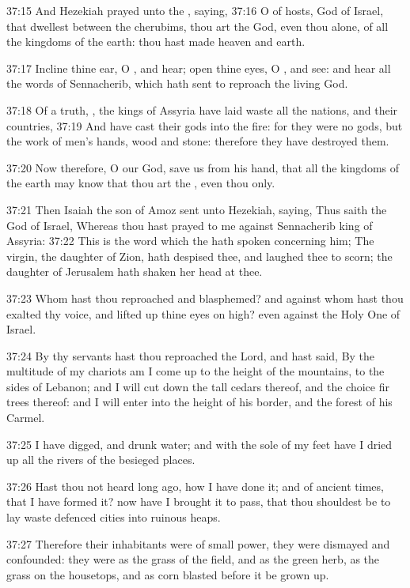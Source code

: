 37:15 And Hezekiah prayed unto the \LORD, saying, 37:16 O \LORD of hosts, God of Israel, that dwellest between the cherubims, thou art the God, even thou alone, of all the kingdoms of the earth: thou hast made heaven and earth.

37:17 Incline thine ear, O \LORD, and hear; open thine eyes, O \LORD, and see: and hear all the words of Sennacherib, which hath sent to reproach the living God.

37:18 Of a truth, \LORD, the kings of Assyria have laid waste all the nations, and their countries, 37:19 And have cast their gods into the fire: for they were no gods, but the work of men's hands, wood and stone: therefore they have destroyed them.

37:20 Now therefore, O \LORD our God, save us from his hand, that all the kingdoms of the earth may know that thou art the \LORD, even thou only.

37:21 Then Isaiah the son of Amoz sent unto Hezekiah, saying, Thus saith the \LORD God of Israel, Whereas thou hast prayed to me against Sennacherib king of Assyria: 37:22 This is the word which the \LORD hath spoken concerning him; The virgin, the daughter of Zion, hath despised thee, and laughed thee to scorn; the daughter of Jerusalem hath shaken her head at thee.

37:23 Whom hast thou reproached and blasphemed? and against whom hast thou exalted thy voice, and lifted up thine eyes on high? even against the Holy One of Israel.

37:24 By thy servants hast thou reproached the Lord, and hast said, By the multitude of my chariots am I come up to the height of the mountains, to the sides of Lebanon; and I will cut down the tall cedars thereof, and the choice fir trees thereof: and I will enter into the height of his border, and the forest of his Carmel.

37:25 I have digged, and drunk water; and with the sole of my feet have I dried up all the rivers of the besieged places.

37:26 Hast thou not heard long ago, how I have done it; and of ancient times, that I have formed it? now have I brought it to pass, that thou shouldest be to lay waste defenced cities into ruinous heaps.

37:27 Therefore their inhabitants were of small power, they were dismayed and confounded: they were as the grass of the field, and as the green herb, as the grass on the housetops, and as corn blasted before it be grown up.

